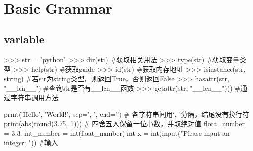 \section{Basic Grammar}

  \subsection{variable}
    \begin{codeblock}[language=python, caption={variable type}]
      >>> str = "python"
      >>> dir(str) #获取相关用法
      >>> type(str) #获取变量类型
      >>> help(str) #获取guide
      >>> id(str) #获取内存地址
      >>> isinstance(str, string) #若str为string类型，则返回True，否则返回False
      >>> hasattr(str, "__len__") #查询str是否有\_\_len\_\_函数
      >>> getattr(str, "__len__")() #通过字符串调用方法
    \end{codeblock}

    \begin{codeblock}[language=python, caption={basic functions}]
      print('Hello', 'World!', sep=', ', end='') # 各字符串间用`, '分隔，结尾没有换行符
      print(abs(round(3.75, 1))) # 四舍五入保留一位小数，并取绝对值
      float_number = 3.3; int_number = int(float_number)
      int x = int(input("Please input an integer: ")) #输入
    \end{codeblock}


